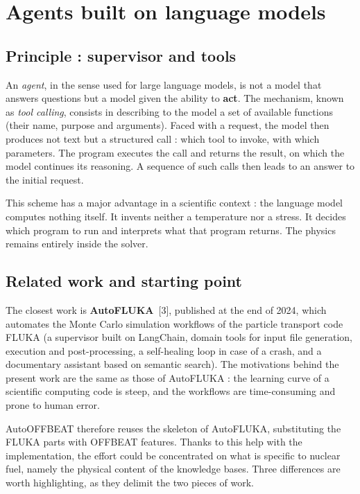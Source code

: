 \documentclass[12pt,a4paper]{report}
\begin{document}
\section{Agents built on language models}

\subsection{Principle : supervisor and tools}

An \textit{agent}, in the sense used for large language models, is not a model
that answers questions but a model given the ability to \textbf{act}. The
mechanism, known as \textit{tool calling}, consists in describing to the model a
set of available functions (their name, purpose and arguments). Faced with a
request, the model then produces not text but a structured call : which tool to
invoke, with which parameters. The program executes the call and returns the
result, on which the model continues its reasoning. A sequence of such calls
then leads to an answer to the initial request.

This scheme has a major advantage in a scientific context : the language model
computes nothing itself. It invents neither a temperature nor a stress. It
decides which program to run and interprets what that program returns. The
physics remains entirely inside the solver.

\subsection{Related work and starting point}

The closest work is \textbf{AutoFLUKA}~[3], published at the end of \num{2024},
which automates the Monte Carlo simulation workflows of the particle transport
code FLUKA (a supervisor built on LangChain, domain tools for input file
generation, execution and post-processing, a self-healing loop in case of a
crash, and a documentary assistant based on semantic search). The motivations
behind the present work are the same as those of AutoFLUKA : the learning curve
of a scientific computing code is steep, and the workflows are time-consuming
and prone to human error.

AutoOFFBEAT therefore reuses the skeleton of AutoFLUKA, substituting the FLUKA
parts with OFFBEAT features. Thanks to this help with the implementation, the
effort could be concentrated on what is specific to nuclear fuel, namely the
physical content of the knowledge bases. Three differences are worth
highlighting, as they delimit the two pieces of work.
\end{document}
